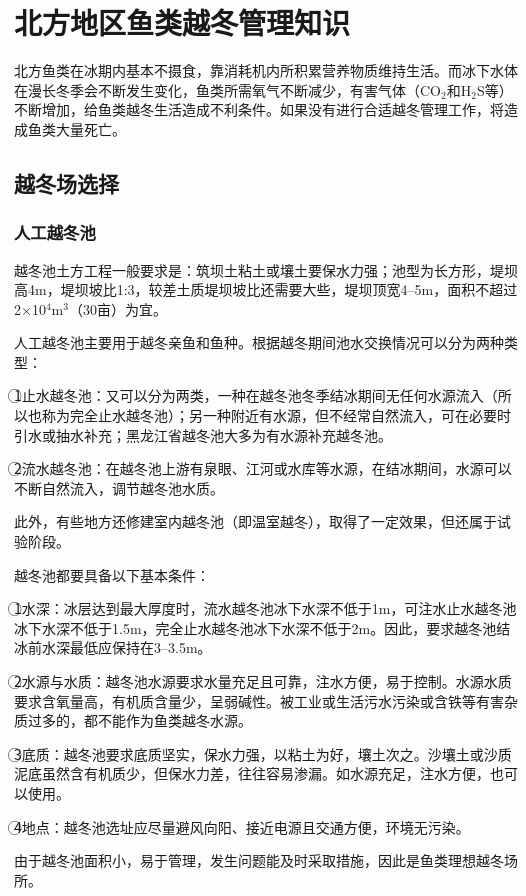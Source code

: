 \documentclass{ctexbook}
\begin{document}
\section{北方地区鱼类越冬管理知识}
北方鱼类在冰期内基本不摄食，靠消耗机内所积累营养物质维持生活。而冰下水体在漫长冬季会不断发生变化，鱼类所需氧气不断减少，有害气体（CO$_2$和H$_2$S等）不断增加，给鱼类越冬生活造成不利条件。如果没有进行合适越冬管理工作，将造成鱼类大量死亡。
\subsection{越冬场选择}
\subsubsection{人工越冬池}
越冬池土方工程一般要求是：筑坝土粘土或壤土要保水力强；池型为长方形，堤坝高4m，堤坝坡比1:3，较差土质堤坝坡比还需要大些，堤坝顶宽4--5m，面积不超过2$\times$10$^{4}$m$^{3}$（30亩）为宜。

人工越冬池主要用于越冬亲鱼和鱼种。根据越冬期间池水交换情况可以分为两种类型：

\textcircled{1}{\fangsong 止水越冬池}：又可以分为两类，一种在越冬池冬季结冰期间无任何水源流入（所以也称为完全止水越冬池）；另一种附近有水源，但不经常自然流入，可在必要时引水或抽水补充；黑龙江省越冬池大多为有水源补充越冬池。

\textcircled{2}{\fangsong 流水越冬池}：在越冬池上游有泉眼、江河或水库等水源，在结冰期间，水源可以不断自然流入，调节越冬池水质。

此外，有些地方还修建室内越冬池（即温室越冬），取得了一定效果，但还属于试验阶段。

越冬池都要具备以下基本条件：

\textcircled{1}水深：冰层达到最大厚度时，流水越冬池冰下水深不低于1m，可注水止水越冬池冰下水深不低于1.5m，完全止水越冬池冰下水深不低于2m。因此，要求越冬池结冰前水深最低应保持在3--3.5m。

\textcircled{2}水源与水质：越冬池水源要求水量充足且可靠，注水方便，易于控制。水源水质要求含氧量高，有机质含量少，呈弱碱性。被工业或生活污水污染或含铁等有害杂质过多的，都不能作为鱼类越冬水源。

\textcircled{3}底质：越冬池要求底质坚实，保水力强，以粘土为好，壤土次之。沙壤土或沙质泥底虽然含有机质少，但保水力差，往往容易渗漏。如水源充足，注水方便，也可以使用。

\textcircled{4}地点：越冬池选址应尽量避风向阳、接近电源且交通方便，环境无污染。

由于越冬池面积小，易于管理，发生问题能及时采取措施，因此是鱼类理想越冬场所。
\end{document}
